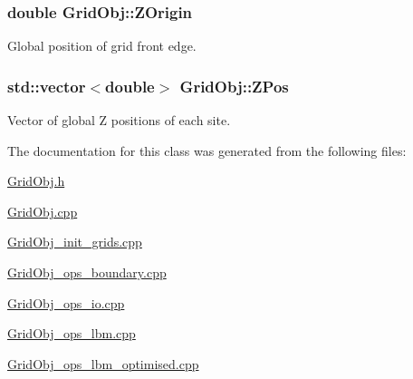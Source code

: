 \subsubsection[{\texorpdfstring{Z\+Origin}{ZOrigin}}]{\setlength{\rightskip}{0pt plus 5cm}double Grid\+Obj\+::\+Z\+Origin}\hypertarget{class_grid_obj_a69d43fd31ba7edd4fc9f02eb0c0fcefd}{}\label{class_grid_obj_a69d43fd31ba7edd4fc9f02eb0c0fcefd}


Global position of grid front edge. 

\subsubsection[{\texorpdfstring{Z\+Pos}{ZPos}}]{\setlength{\rightskip}{0pt plus 5cm}std\+::vector$<$double$>$ Grid\+Obj\+::\+Z\+Pos}\hypertarget{class_grid_obj_af859d35bf0a03cee8965ce3e22e651c6}{}\label{class_grid_obj_af859d35bf0a03cee8965ce3e22e651c6}


Vector of global Z positions of each site. 



The documentation for this class was generated from the following files\+:\begin{DoxyCompactItemize}
\item 
\hyperlink{_grid_obj_8h}{Grid\+Obj.\+h}\item 
\hyperlink{_grid_obj_8cpp}{Grid\+Obj.\+cpp}\item 
\hyperlink{_grid_obj__init__grids_8cpp}{Grid\+Obj\+\_\+init\+\_\+grids.\+cpp}\item 
\hyperlink{_grid_obj__ops__boundary_8cpp}{Grid\+Obj\+\_\+ops\+\_\+boundary.\+cpp}\item 
\hyperlink{_grid_obj__ops__io_8cpp}{Grid\+Obj\+\_\+ops\+\_\+io.\+cpp}\item 
\hyperlink{_grid_obj__ops__lbm_8cpp}{Grid\+Obj\+\_\+ops\+\_\+lbm.\+cpp}\item 
\hyperlink{_grid_obj__ops__lbm__optimised_8cpp}{Grid\+Obj\+\_\+ops\+\_\+lbm\+\_\+optimised.\+cpp}\end{DoxyCompactItemize}
